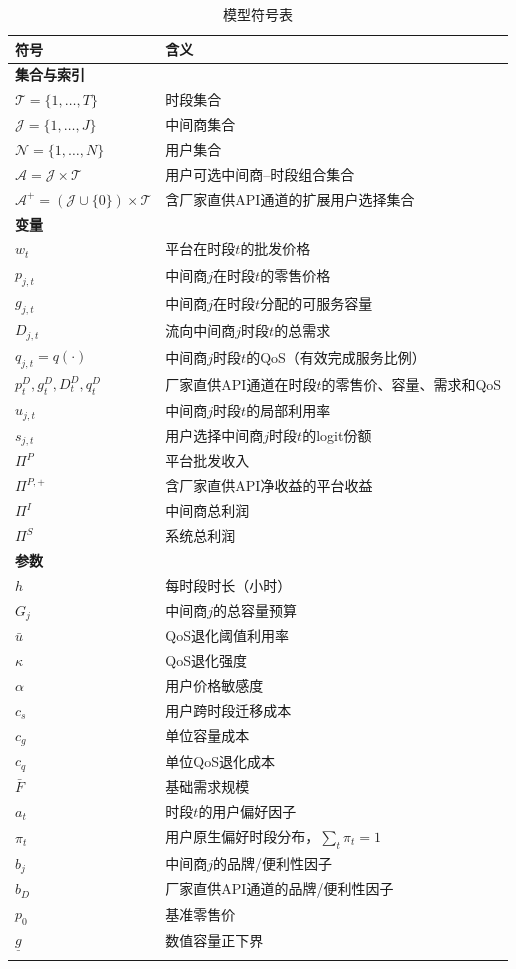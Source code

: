 \documentclass[UTF8,11pt]{ctexart}
\newcommand{\qos}{q}
\newcommand{\T}{\mathcal{T}}
\newcommand{\J}{\mathcal{J}}
\newcommand{\N}{\mathcal{N}}
\newcommand{\A}{\mathcal{A}}
\newcommand{\D}{D}
\begin{document}
\begin{longtable}{@{}p{}p{}@{}}
\toprule
符号 & 含义 \\
\midrule
\endhead
\multicolumn{2}{l}{\textbf{集合与索引}} \\
$\T=\{1,\ldots,T\}$ & 时段集合 \\
$\J=\{1,\ldots,J\}$ & 中间商集合 \\
$\N=\{1,\ldots,N\}$ & 用户集合 \\
$\A=\J\times\T$ & 用户可选中间商--时段组合集合 \\
$\A^+=(\J\cup\{0\})\times\T$ & 含厂家直供API通道的扩展用户选择集合 \\
\midrule
\multicolumn{2}{l}{\textbf{变量}} \\
$w_t$ & 平台在时段$t$的批发价格 \\
$p_{j,t}$ & 中间商$j$在时段$t$的零售价格 \\
$g_{j,t}$ & 中间商$j$在时段$t$分配的可服务容量 \\
$\D_{j,t}$ & 流向中间商$j$时段$t$的总需求 \\
$q_{j,t}=\qos(\cdot)$ & 中间商$j$时段$t$的QoS（有效完成服务比例） \\
$p^D_t,g^D_t,\D^D_t,q^D_t$ & 厂家直供API通道在时段$t$的零售价、容量、需求和QoS \\
$u_{j,t}$ & 中间商$j$时段$t$的局部利用率 \\
$s_{j,t}$ & 用户选择中间商$j$时段$t$的logit份额 \\
$\Pi^P$ & 平台批发收入 \\
$\Pi^{P,+}$ & 含厂家直供API净收益的平台收益 \\
$\Pi^I$ & 中间商总利润 \\
$\Pi^S$ & 系统总利润 \\
\midrule
\multicolumn{2}{l}{\textbf{参数}} \\
$h$ & 每时段时长（小时） \\
$G_j$ & 中间商$j$的总容量预算 \\
$\bar u$ & QoS退化阈值利用率 \\
$\kappa$ & QoS退化强度 \\
$\alpha$ & 用户价格敏感度 \\
$c_s$ & 用户跨时段迁移成本 \\
$c_g$ & 单位容量成本 \\
$c_q$ & 单位QoS退化成本 \\
$\bar F$ & 基础需求规模 \\
$a_t$ & 时段$t$的用户偏好因子 \\
$\pi_t$ & 用户原生偏好时段分布，$\sum_t\pi_t=1$ \\
$b_j$ & 中间商$j$的品牌/便利性因子 \\
$b_D$ & 厂家直供API通道的品牌/便利性因子 \\
$p_0$ & 基准零售价 \\
$\underline g$ & 数值容量正下界 \\
\bottomrule
\caption{模型符号表}
\label{tab:nomenclature}
\end{longtable}
\end{document}
